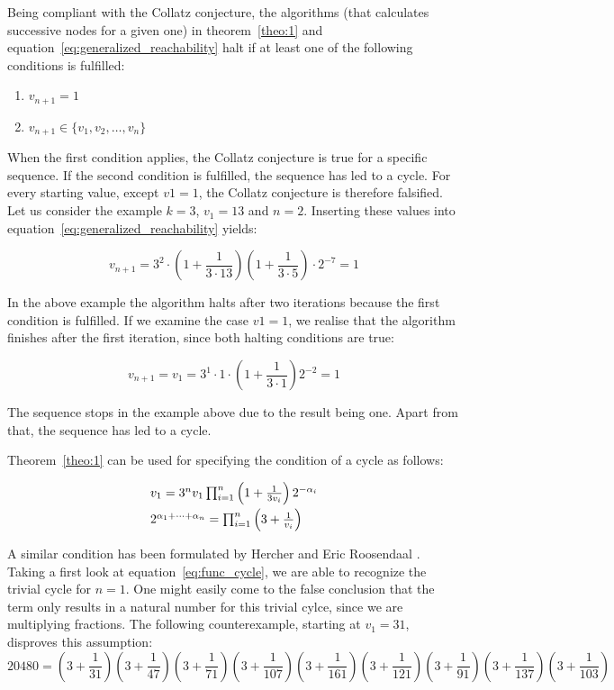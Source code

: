 \begin{definition}
	\label{def:halting_conditions}
	Being compliant with the Collatz conjecture, the algorithms (that calculates successive nodes for a given one) in theorem~\ref{theo:1} and equation~\ref{eq:generalized_reachability} halt if at least one of the following conditions is fulfilled:
	\begin{enumerate}
		\item $v_{n+1}=1$
		\item $v_{n+1}\in\{v_1,v_2,\ldots,v_n\}$
	\end{enumerate}
	When the first condition applies, the Collatz conjecture is true for a specific sequence. If the second condition is fulfilled, the sequence has led to a cycle. For every starting value, except $v1=1$, the Collatz conjecture is therefore falsified. Let us consider the example $k=3$, $v_1=13$ and $n=2$. Inserting these values into equation~\ref{eq:generalized_reachability} yields:
	
	\[
	v_{n+1}=3^2\cdot\left(1+\frac{1}{3\cdot13}\right)\left(1+\frac{1}{3\cdot5}\right)\cdot2^{-7}=1
	\]
	
	In the above example the algorithm halts after two iterations because the first condition is fulfilled. If we examine the case $v1=1$, we realise that the algorithm finishes after the first iteration, since both	halting conditions are true:
	
	\[
	v_{n+1}=v_1=3^1\cdot1\cdot\left(1+\frac{1}{3\cdot1}\right)2^{-2}=1
	\]
	
	The sequence stops in the example above due to the result being one. Apart from that, the sequence has led to a cycle.
\end{definition}

\noindent
Theorem~\ref{theo:1} can be used for specifying the condition of a cycle as follows:

\begin{equation}
\label{eq:func_cycle}
\begin{array}{l}
v_{1}=3^nv_1\prod_{i=1}^{n}\left(1+\frac{1}{3v_i}\right)2^{-\alpha_i}
\\[\medskipamount]
2^{\alpha_1+\cdots+\alpha_n}=\prod_{i=1}^{n}\left(3+\frac{1}{v_i}\right)
\end{array}
\end{equation}

A similar condition has been formulated by Hercher \cite{Ref_Hercher} and Eric Roosendaal \cite{Ref_Roosendaal_2020}. Taking a first look at equation~\ref{eq:func_cycle}, we are able to recognize the trivial cycle for $n=1$. One might easily come to the false conclusion that the term only results in a natural number for this trivial cylce, since we are multiplying fractions. The following counterexample, starting at $v_1=31$, disproves this assumption:
\begin{equation*}
20480=\left(3+\frac{1}{31}\right)\left(3+\frac{1}{47}\right)
\left(3+\frac{1}{71}\right)\left(3+\frac{1}{107}\right)\left(3+\frac{1}{161}\right)\left(3+\frac{1}{121}\right)\left(3+\frac{1}{91}\right)\left(3+\frac{1}{137}\right)\left(3+\frac{1}{103}\right)
\end{equation*}

